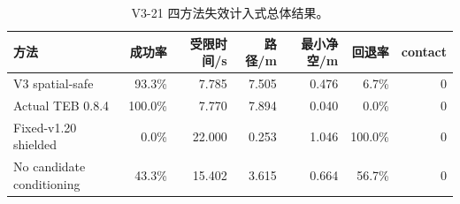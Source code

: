 \begin{table}[htbp]
\centering
\caption{V3-21 四方法失效计入式总体结果。}
\label{tab:v321-methods}
\footnotesize
\begin{tabular}{lrrrrrr}
\toprule
方法 & 成功率 & 受限时间/s & 路径/m & 最小净空/m & 回退率 & contact\\
\midrule
V3 spatial-safe & 93.3\% & 7.785 & 7.505 & 0.476 & 6.7\% & 0\\
Actual TEB 0.8.4 & 100.0\% & 7.770 & 7.894 & 0.040 & 0.0\% & 0\\
Fixed-v1.20 shielded & 0.0\% & 22.000 & 0.253 & 1.046 & 100.0\% & 0\\
No candidate conditioning & 43.3\% & 15.402 & 3.615 & 0.664 & 56.7\% & 0\\
\bottomrule
\end{tabular}
\end{table}
